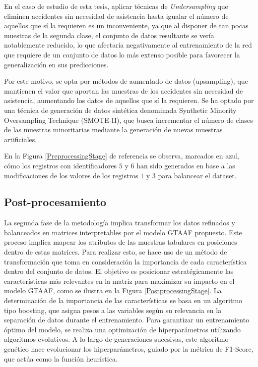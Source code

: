 En el caso de estudio de esta tesis, aplicar técnicas de \textit{Undersampling} que eliminen accidentes sin necesidad de asistencia hasta igualar el número de aquellos que sí la requieren es un inconveniente, ya que al disponer de tan pocas muestras de la segunda clase, el conjunto de datos resultante se vería notablemente reducido, lo que afectaría negativamente al entrenamiento de la red que requiere de un conjunto de datos lo más extenso posible para favorecer la generalización en sus predicciones.

Por este motivo, se opta por métodos de aumentado de datos (upsampling), que mantienen el valor que aportan las muestras de los accidentes sin necesidad de asistencia, aumentando los datos de aquellos que sí la requieren. Se ha optado por una técnica de generación de datos sintética denominada Synthetic Minority Oversampling Technique (SMOTE-II), que busca incrementar el número de clases de las muestras minoritarias mediante la generación de nuevas muestras artificiales.

En la Figura \ref{PreprocessingStage} de referencia se observa, marcados en azul, cómo los registros con identificadores $5$ y $6$ han sido generados en base a las modificaciones de los valores de los registros $1$ y $3$ para balancear el dataset.



\subsection{Post-procesamiento}

La segunda fase de la metodología implica transformar los datos refinados y balanceados en matrices interpretables por el modelo GTAAF propuesto. Este proceso implica mapear los atributos de las muestras tabulares en posiciones dentro de estas matrices. Para realizar esto, se hace uso de un método de transformación que toma en consideración la importancia de cada característica dentro del conjunto de datos. El objetivo es posicionar estratégicamente las características más relevantes en la matriz para maximizar su impacto en el modelo GTAAF, como se ilustra en la Figura \ref{PostprocessingStage}. La determinación de la importancia de las características se basa en un algoritmo tipo boosting, que asigna pesos a las variables según su relevancia en la separación de datos durante el entrenamiento. Para garantizar un entrenamiento óptimo del modelo, se realiza una optimización de hiperparámetros utilizando algoritmos evolutivos. A lo largo de generaciones sucesivas, este algoritmo genético hace evolucionar los hiperparámetros, guiado por la métrica de F1-Score, que actúa como la función heurística.

